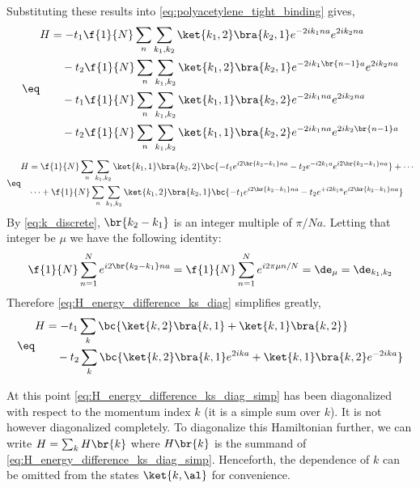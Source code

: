 \documentclass{article}
\begin{document}
Substituting these results into \cref{eq:polyacetylene_tight_binding} gives,
\begin{align*}
\eq \label{eq:H_polyacetylene}
\begin{split}
H
&= - t_1 \f{1}{N} \sum_{n} \sum_{k_1 ,k_2} \ket{k_1, 2}\bra{k_2, 1} e^{-2ik_1na}e^{2ik_2na} \\
&\quad  - t_2 \f{1}{N} \sum_{n} \sum_{k_1 ,k_2} \ket{k_1, 2}\bra{k_2, 1} e^{-2ik_1\br{n-1}a}e^{2ik_2na} \\
&\quad  - t_1 \f{1}{N} \sum_{n} \sum_{k_1 ,k_2} \ket{k_1, 1}\bra{k_2, 2} e^{-2ik_1na}e^{2ik_2na} \\
&\quad  - t_2 \f{1}{N} \sum_{n} \sum_{k_1 ,k_2} \ket{k_1, 1}\bra{k_2, 2} e^{-2ik_1na}e^{2ik_2\br{n-1}a}
\end{split}
\end{align*}
\begin{align*}
    \eq \label{eq:H_energy_difference_ks_diag}
    \begin{split}
    H
    &= \f{1}{N}\sum_{n} \sum_{k_1, k_2} \ket{k_1, 1}\bra{k_2, 2} \bc{-t_1 e^{i2\br{k_2 - k_1}na} - t_2 e^{- i2k_1a}e^{i2\br{k_2 - k_1}na}}+ \cdots\\
    &\cdots + \f{1}{N}\sum_{n} \sum_{k_1, k_2} \ket{k_1, 2}\bra{k_2, 1} \bc{-t_1 e^{i2\br{k_2 - k_1}na} - t_2 e^{+ i2k_1a}e^{i2\br{k_2 - k_1}na}}
    \end{split}
\end{align*}
By \cref{eq:k_discrete}, $\br{k_2 - k_1}$ is an integer multiple of $\pi / Na$. Letting that integer be $\mu$ we have the following identity:
\[ \f{1}{N} \sum_{n=1}^{N} e^{i2\br{k_2 - k_1}na} = \f{1}{N} \sum_{n=1}^{N} e^{i2 \pi \mu n / N} = \de_{\mu} = \de_{k_1, k_2} \]
Therefore \cref{eq:H_energy_difference_ks_diag} simplifies greatly,
\begin{align*}
    \eq \label{eq:H_energy_difference_ks_diag_simp}
    \begin{split}
    H
    &= - t_1 \sum_{k}\bc{\ket{k ,2} \bra{k, 1} + \ket{k, 1}\bra{k,2}} \\
    &\quad - t_2 \sum_{k}\bc{\ket{k ,2} \bra{k, 1}e^{2ika} + \ket{k, 1}\bra{k,2}e^{-2ika}}
    \end{split}
\end{align*}

At this point \cref{eq:H_energy_difference_ks_diag_simp} has been diagonalized with respect to the momentum index $k$ (it is a simple sum over $k$). It is not however diagonalized completely. To diagonalize this Hamiltonian further, we can write $H = \sum_{k} H\br{k}$ where $H\br{k}$ is the summand of \cref{eq:H_energy_difference_ks_diag_simp}. Henceforth, the dependence of $k$ can be omitted from the states $\ket{k, \al}$ for convenience.
\end{document}
